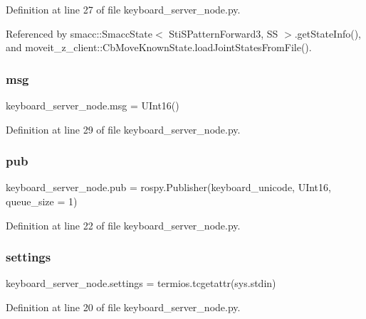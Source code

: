 Definition at line 27 of file keyboard\+\_\+server\+\_\+node.\+py.



Referenced by smacc\+::\+Smacc\+State$<$ Sti\+S\+Pattern\+Forward3, S\+S $>$.\+get\+State\+Info(), and moveit\+\_\+z\+\_\+client\+::\+Cb\+Move\+Known\+State.\+load\+Joint\+States\+From\+File().

\mbox{\label{namespacekeyboard__server__node_a555024e72f3e57503b0eebad2546fc72}} 
\subsubsection{\texorpdfstring{msg}{msg}}
{\footnotesize\ttfamily keyboard\+\_\+server\+\_\+node.\+msg = U\+Int16()}



Definition at line 29 of file keyboard\+\_\+server\+\_\+node.\+py.

\mbox{\label{namespacekeyboard__server__node_acb9a153a1e2ddb5dab254f49ade8512e}} 
\subsubsection{\texorpdfstring{pub}{pub}}
{\footnotesize\ttfamily keyboard\+\_\+server\+\_\+node.\+pub = rospy.\+Publisher(\textquotesingle{}keyboard\+\_\+unicode\textquotesingle{}, U\+Int16, queue\+\_\+size = 1)}



Definition at line 22 of file keyboard\+\_\+server\+\_\+node.\+py.

\mbox{\label{namespacekeyboard__server__node_ade1a45e58d917f8cdb07d1d54ac6bd34}} 
\subsubsection{\texorpdfstring{settings}{settings}}
{\footnotesize\ttfamily keyboard\+\_\+server\+\_\+node.\+settings = termios.\+tcgetattr(sys.\+stdin)}



Definition at line 20 of file keyboard\+\_\+server\+\_\+node.\+py.

